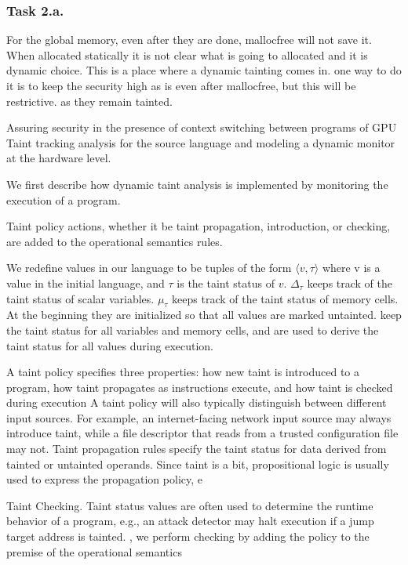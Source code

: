 \subsubsection{Task 2.a.} 
For the global memory, even after they are done, mallocfree will not save it.  When allocated statically it is not clear what is going to allocated and it is  dynamic choice.
This is a place where a dynamic tainting comes in.
one way to do it is to keep the security high as is even after mallocfree, but this will be restrictive. as they remain tainted.

Assuring security in the presence of context switching between programs of GPU
Taint tracking analysis for the source language and modeling a dynamic monitor at the hardware level.

We first describe how dynamic taint analysis
is implemented by monitoring the execution of a program.

Taint policy actions, whether it be taint propagation, introduction,
or checking, are added to the operational semantics rules.

We redefine values in our language to be tuples of the form $\langle v, \tau \rangle$ where v is a value in the initial language, and $\tau$ is the taint status of $v$. 
$\Delta_\tau$ keeps track of the taint status of
scalar variables. $\mu_\tau$ keeps track of the taint status of memory cells. 
At the beginning they are initialized so that all values are marked
untainted. keep the taint status for all
variables and memory cells, and are used to derive the taint
status for all values during execution.

A taint policy specifies three properties: how new taint is
introduced to a program, how taint propagates as instructions
execute, and how taint is checked during execution
A taint policy will also typically
distinguish between different input sources.
For example, an
internet-facing network input source may always introduce
taint, while a file descriptor that reads from a trusted
configuration file may not.
Taint propagation rules specify the taint
status for data derived from tainted or untainted operands.
Since taint is a bit, propositional logic is usually used to
express the propagation policy, e

Taint Checking. Taint status values are often used to
determine the runtime behavior of a program, e.g., an attack
detector may halt execution if a jump target address is
tainted. , we perform checking by adding the
policy to the premise of the operational semantics


